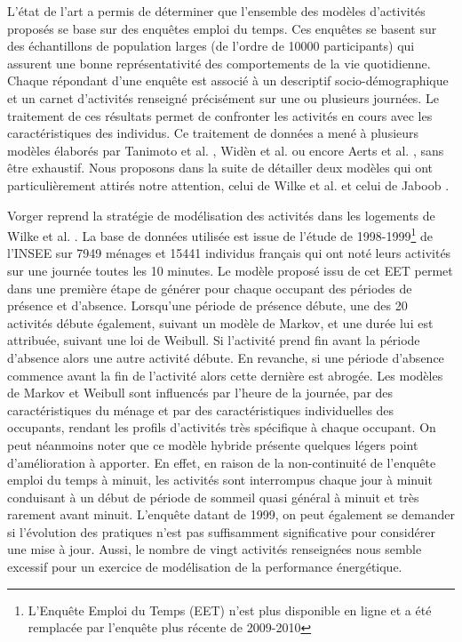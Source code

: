 L'état de l'art a permis de déterminer que l'ensemble des modèles d'activités proposés se base sur des enquêtes emploi du temps. Ces enquêtes se basent sur des échantillons de population larges (de l'ordre de 10000 participants) qui assurent une bonne représentativité des comportements de la vie quotidienne. Chaque répondant d'une enquête est associé à un descriptif socio-démographique et un carnet d'activités renseigné précisément sur une ou plusieurs journées. Le traitement de ces résultats permet de confronter les activités en cours avec les caractéristiques des individus. Ce traitement de données a mené à plusieurs modèles élaborés par Tanimoto et al. \cite{Tanimoto-08}, Widèn et al. \cite{Widen-12} ou encore Aerts et al. \cite{Aerts-14}, sans être exhaustif. Nous proposons dans la suite de détailler deux modèles qui ont particulièrement attirés notre attention, celui de Wilke et al. \cite{Wilke-13} et celui de Jaboob \cite{Jaboob-16}.

Vorger \cite{Vorger-14} reprend la stratégie de modélisation des activités dans les logements de Wilke et al. \cite{Wilke-13}. La base de données utilisée est issue de l'étude de 1998-1999\footnote{L'Enquête Emploi du Temps (EET) n'est plus disponible en ligne et a été remplacée par l'enquête plus récente de 2009-2010} de l'INSEE sur 7949 ménages et 15441 individus français qui ont noté leurs activités sur une journée toutes les 10 minutes. Le modèle proposé issu de cet EET permet dans une première étape de générer pour chaque occupant des périodes de présence et d'absence. Lorsqu'une période de présence débute, une des 20 activités débute également, suivant un modèle de Markov, et une durée lui est attribuée, suivant une loi de Weibull. Si l'activité prend fin avant la période d'absence alors une autre activité débute. En revanche, si une période d'absence commence avant la fin de l'activité alors cette dernière est abrogée. Les modèles de Markov et Weibull sont influencés par l'heure de la journée, par des caractéristiques du ménage et par des caractéristiques individuelles des occupants, rendant les profils d'activités très spécifique à chaque occupant. On peut néanmoins noter que ce modèle hybride présente quelques légers point d'amélioration à apporter. En effet, en raison de la non-continuité de l'enquête emploi du temps à minuit, les activités sont interrompus chaque jour à minuit conduisant à un début de période de sommeil quasi général à minuit et très rarement avant minuit. L'enquête datant de 1999, on peut également se demander si l'évolution des pratiques n'est pas suffisamment significative pour considérer une mise à jour. Aussi, le nombre de vingt activités renseignées nous semble excessif pour un exercice de modélisation de la performance énergétique.

